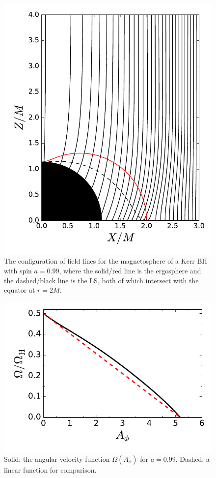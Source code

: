 \documentclass[aps,prd,reprint,nofootinbib, superscriptaddress]{revtex4-1}
\def\Ap{A_\phi}
\begin{document}
\begin{figure}
\includegraphics[scale=0.55]{f1}
\caption{\label{fig:field_lines} The configuration of field lines for the magnetosphere of a Kerr BH with spin $a=0.99$,
where the solid/red line is the ergosphere and the dashed/black line is the LS, both of which intersect with
the equator at $r=2 M$. }
\end{figure}

\begin{figure}
\includegraphics[scale=0.6]{f2}
\caption{\label{fig:omega} Solid: the angular velocity function $\Omega(\Ap)$ for $a=0.99$.
Dashed: a linear function for comparison.}
\end{figure}
\end{document}
